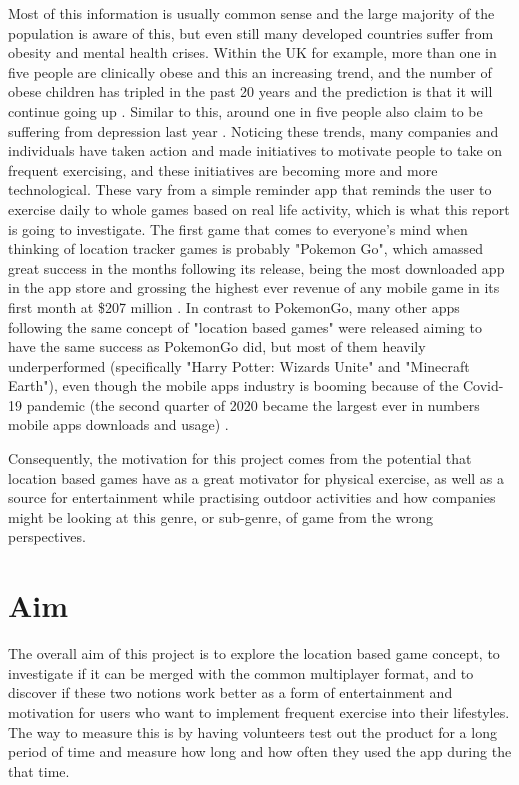 \documentclass{dissertation}
\begin{document}
Most of this information is usually common sense and the large majority of the population is aware of this, but even still 
many developed countries suffer from obesity and mental health crises. Within the UK for example, more than one in five 
people are clinically obese and this an increasing trend, and the number of obese children has tripled in the past 20 years and 
the prediction is that it will continue going up \citep{Shan08}. Similar to this, around one in five people also claim to be 
suffering from depression last year \citep{Wallis21}. Noticing these trends, many companies and individuals have taken 
action and made initiatives to motivate people to take on frequent exercising, and these initiatives are becoming more and 
more technological. These vary from a simple reminder app that reminds the user to exercise daily to whole games based 
on real life activity, which is what this report is going to investigate. The first game that comes to everyone's mind 
when thinking of location tracker games is probably "Pokemon Go", which amassed great success in the months following its 
release, being the most downloaded app in the app store and grossing the highest ever revenue of any mobile game in its 
first month at \$207 million \citep{Iqbal21}. In contrast to PokemonGo, many other apps following the same concept of 
"location based games" were released aiming to have the same success as PokemonGo did, but most of them heavily 
underperformed (specifically "Harry Potter: Wizards Unite" and "Minecraft Earth"), even though the mobile apps industry is 
booming because of the Covid-19 pandemic (the second quarter of 2020 became the largest ever in numbers mobile apps 
downloads and usage) \citep{Perez20}. 

Consequently, the motivation for this project comes from the potential that location based games have as a great motivator for 
physical exercise, as well as a source for entertainment while practising outdoor activities and how companies might be looking 
at this genre, or sub-genre, of game from the wrong perspectives.

\section{Aim}
 
The overall aim of this project is to explore the location based game concept, to investigate if it can be merged with the common 
multiplayer format, and to discover if these two notions work better as a form of entertainment and motivation for users who want to 
implement frequent exercise into their lifestyles. The way to measure this is by having volunteers test out the product for a 
long period of time and measure how long and how often they used the app during the that time.
\end{document}
